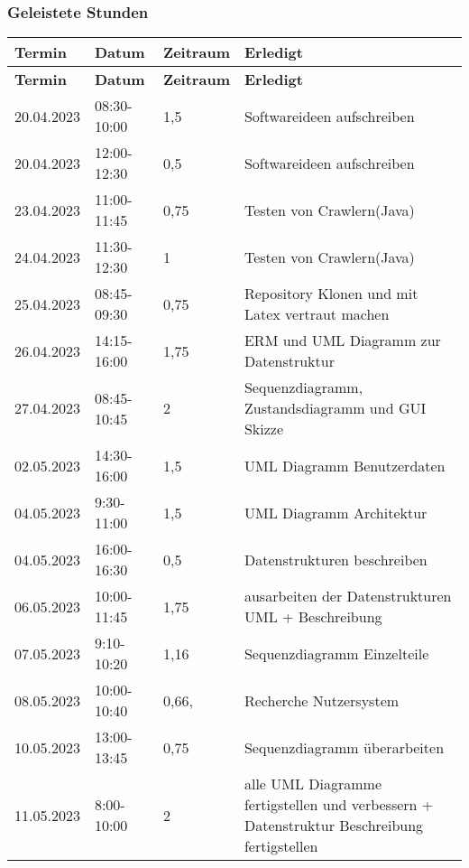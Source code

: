 \subsubsection{Geleistete Stunden}
\begin{flushleft}
		\begin{longtable}{p{2cm}p{}p{2cm}p{}}
            \toprule
            \textbf{Termin} & \textbf{Datum} & \textbf{Zeitraum} & \textbf{Erledigt}\\
            \midrule\endfirsthead
            \toprule
            \textbf{Termin} & \textbf{Datum} & \textbf{Zeitraum} & \textbf{Erledigt}\\
            \midrule\endhead
            	20.04.2023 & 08:30-10:00 & 1,5 & Softwareideen aufschreiben\\ \midrule
    			20.04.2023 & 12:00-12:30 & 0,5 & Softwareideen aufschreiben\\ \midrule
    			23.04.2023 & 11:00-11:45 & 0,75 & Testen von Crawlern(Java)\\ \midrule
    			24.04.2023 & 11:30-12:30 & 1 & Testen von Crawlern(Java)\\ \midrule
    			25.04.2023 & 08:45-09:30 & 0,75 & Repository Klonen und mit Latex vertraut machen\\ \midrule
    			26.04.2023 & 14:15-16:00 & 1,75 & ERM und UML Diagramm zur Datenstruktur\\ \midrule
    			27.04.2023 & 08:45-10:45 & 2 & Sequenzdiagramm, Zustandsdiagramm und GUI Skizze\\
    			02.05.2023 & 14:30-16:00 & 1,5 & UML Diagramm Benutzerdaten\\ \midrule
    			04.05.2023 & 9:30-11:00 & 1,5 & UML Diagramm Architektur\\ \midrule
    			04.05.2023 & 16:00-16:30& 0,5 & Datenstrukturen beschreiben\\ \midrule
    			06.05.2023 & 10:00-11:45 & 1,75 & ausarbeiten der Datenstrukturen UML + Beschreibung \\ \midrule
    			07.05.2023 & 9:10-10:20 & 1,16 & Sequenzdiagramm Einzelteile\\ \midrule
    			08.05.2023 & 10:00-10:40 & 0,66, & Recherche Nutzersystem\\ \midrule
    			10.05.2023 & 13:00-13:45 & 0,75 & Sequenzdiagramm überarbeiten\\ \midrule
    			11.05.2023 & 8:00-10:00 & 2 & alle UML Diagramme fertigstellen und verbessern + Datenstruktur Beschreibung fertigstellen\\ \midrule

            \bottomrule
    \end{longtable}
\end{flushleft}